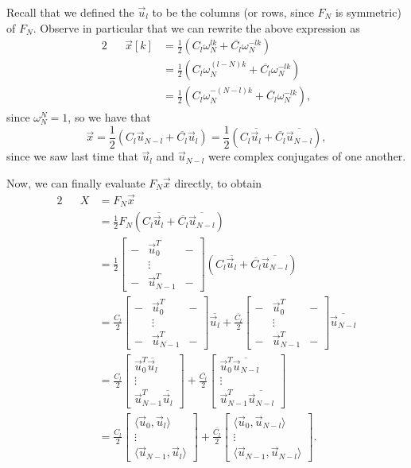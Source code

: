 \documentclass[letterpaper]{article}
\theoremstyle{remark}
\newcommand{\mat}[1]{\ensuremath{\begin{bmatrix}#1\end{bmatrix}}}
\newcommand{\eqn}[1]{\begin{alignat*}{2}#1\end{alignat*}}
\begin{document}
Recall that we defined the $\vec{u}_l$ to be the columns (or rows, since $F_N$ is symmetric) of $F_N$. Observe in particular that we can rewrite the above expression as
\eqn{
    && \vec{x}[k] &= \frac{1}{2} (C_l\omega_N^{lk} + \overline{C_l}\omega_N^{-lk}) \\
    &&&= \frac{1}{2} (C_l\omega_N^{(l - N)k} + \overline{C_l}\omega_N^{-lk}) \\
    &&&= \frac{1}{2} (C_l\omega_N^{-(N - l)k} + \overline{C_l}\omega_N^{-lk}),
}
since $\omega_N^N = 1$, so we have that
\[
    \vec{x} = \frac{1}{2} (C_l\vec{u}_{N - l} + \overline{C_l}\vec{u}_l) = \frac{1}{2} (C_l\overline{\vec{u}_l} + \overline{C_l}\overline{\vec{u}_{N-l}}),
\]
since we saw last time that $\vec{u}_l$ and $\vec{u}_{N-l}$ were complex conjugates of one another.

Now, we can finally evaluate $F_N\vec{x}$ directly, to obtain
\eqn{
    && X &= F_N \vec{x} \\
    &&&= \frac{1}{2} F_N (C_l\overline{\vec{u}_l} + \overline{C_l}\overline{\vec{u}_{N-l}}) \\
    &&&= \frac{1}{2} \mat{ - & \vec{u}_0^T & - \\ & \vdots & \\ - & \vec{u}_{N-1}^T & - } (C_l\overline{\vec{u}_l} + \overline{C_l}\overline{\vec{u}_{N-l}}) \\
    &&&= \frac{C_l}{2} \mat{ - & \vec{u}_0^T & - \\ & \vdots & \\ - & \vec{u}_{N-1}^T & - } \overline{\vec{u}_l} + \frac{\overline{C_l}}{2} \mat{ - & \vec{u}_0^T & - \\ & \vdots & \\ - & \vec{u}_{N-1}^T & - } \overline{\vec{u}_{N-l}} \\
    &&&= \frac{C_l}{2} \mat{ \vec{u}_0^T\overline{\vec{u}_l} \\ \vdots \\ \vec{u}_{N-1}^T\overline{\vec{u}_l}} + \frac{\overline{C_l}}{2} \mat{ \vec{u}_0^T\overline{\vec{u}_{N - l}} \\ \vdots \\ \vec{u}_{N-1}^T\overline{\vec{u}_{N - l}}} \\
    &&&= \frac{C_l}{2} \mat{\langle \vec{u}_0, \vec{u}_l \rangle \\ \vdots \\ \langle \vec{u}_{N-1}, \vec{u}_l \rangle} + \frac{\overline{C_l}}{2} \mat{\langle \vec{u}_0, \vec{u}_{N-l} \rangle \\ \vdots \\ \langle \vec{u}_{N-1}, \vec{u}_{N-l} \rangle}.
}
\end{document}
